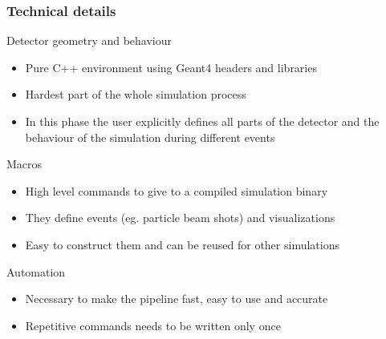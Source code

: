 \begin{frame}
\frametitle{Technical details}

\begin{block}{Detector geometry and behaviour}
	\begin{itemize}
		\item Pure C++ environment using Geant4 headers and libraries
		\item Hardest part of the whole simulation process
		\item In this phase the user explicitly defines all parts of the detector and the behaviour of the simulation during different events
	\end{itemize}
\end{block}

\begin{block}{Macros}
	\begin{itemize}
		\item High level commands to give to a compiled simulation binary
		\item They define events (eg. particle beam shots) and visualizations
		\item Easy to construct them and can be reused for other simulations
	\end{itemize}
\end{block}

\begin{alertblock}{Automation}
	\begin{itemize}
		\item Necessary to make the pipeline fast, easy to use and accurate
		\item Repetitive commands needs to be written only once
	\end{itemize}
\end{alertblock}

\end{frame}